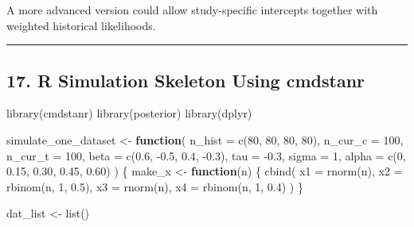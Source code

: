 \documentclass[
  letterpaper,
  DIV=11,
  numbers=noendperiod]{scrartcl}
\newenvironment{Shaded}{\begin{snugshade}}{\end{snugshade}}
\newcommand{\AttributeTok}[1]{\textcolor[rgb]{0.40,0.45,0.13}{#1}}
\newcommand{\ControlFlowTok}[1]{\textcolor[rgb]{0.00,0.23,0.31}{\textbf{#1}}}
\newcommand{\DecValTok}[1]{\textcolor[rgb]{0.68,0.00,0.00}{#1}}
\newcommand{\FloatTok}[1]{\textcolor[rgb]{0.68,0.00,0.00}{#1}}
\newcommand{\FunctionTok}[1]{\textcolor[rgb]{0.28,0.35,0.67}{#1}}
\newcommand{\NormalTok}[1]{\textcolor[rgb]{0.00,0.23,0.31}{#1}}
\newcommand{\OtherTok}[1]{\textcolor[rgb]{0.00,0.23,0.31}{#1}}
\newcommand{\SpecialCharTok}[1]{\textcolor[rgb]{0.37,0.37,0.37}{#1}}
\begin{document}
A more advanced version could allow study-specific intercepts together
with weighted historical likelihoods.

\begin{center}\rule{0.5\linewidth}{0.5pt}\end{center}

\subsection{17. R Simulation Skeleton Using
cmdstanr}\label{r-simulation-skeleton-using-cmdstanr}

\begin{Shaded}
\begin{Highlighting}[]
\FunctionTok{library}\NormalTok{(cmdstanr)}
\FunctionTok{library}\NormalTok{(posterior)}
\FunctionTok{library}\NormalTok{(dplyr)}

\NormalTok{simulate\_one\_dataset }\OtherTok{\textless{}{-}} \ControlFlowTok{function}\NormalTok{(}
  \AttributeTok{n\_hist =} \FunctionTok{c}\NormalTok{(}\DecValTok{80}\NormalTok{, }\DecValTok{80}\NormalTok{, }\DecValTok{80}\NormalTok{, }\DecValTok{80}\NormalTok{),}
  \AttributeTok{n\_cur\_c =} \DecValTok{100}\NormalTok{,}
  \AttributeTok{n\_cur\_t =} \DecValTok{100}\NormalTok{,}
  \AttributeTok{beta =} \FunctionTok{c}\NormalTok{(}\FloatTok{0.6}\NormalTok{, }\SpecialCharTok{{-}}\FloatTok{0.5}\NormalTok{, }\FloatTok{0.4}\NormalTok{, }\SpecialCharTok{{-}}\FloatTok{0.3}\NormalTok{),}
  \AttributeTok{tau =} \SpecialCharTok{{-}}\FloatTok{0.3}\NormalTok{,}
  \AttributeTok{sigma =} \DecValTok{1}\NormalTok{,}
  \AttributeTok{alpha =} \FunctionTok{c}\NormalTok{(}\DecValTok{0}\NormalTok{, }\FloatTok{0.15}\NormalTok{, }\FloatTok{0.30}\NormalTok{, }\FloatTok{0.45}\NormalTok{, }\FloatTok{0.60}\NormalTok{)}
\NormalTok{) \{}
\NormalTok{  make\_x }\OtherTok{\textless{}{-}} \ControlFlowTok{function}\NormalTok{(n) \{}
    \FunctionTok{cbind}\NormalTok{(}
      \AttributeTok{x1 =} \FunctionTok{rnorm}\NormalTok{(n),}
      \AttributeTok{x2 =} \FunctionTok{rbinom}\NormalTok{(n, }\DecValTok{1}\NormalTok{, }\FloatTok{0.5}\NormalTok{),}
      \AttributeTok{x3 =} \FunctionTok{rnorm}\NormalTok{(n),}
      \AttributeTok{x4 =} \FunctionTok{rbinom}\NormalTok{(n, }\DecValTok{1}\NormalTok{, }\FloatTok{0.4}\NormalTok{)}
\NormalTok{    )}
\NormalTok{  \}}

\NormalTok{  dat\_list }\OtherTok{\textless{}{-}} \FunctionTok{list}\NormalTok{()}


\end{Highlighting}
\end{Shaded}
\end{document}
